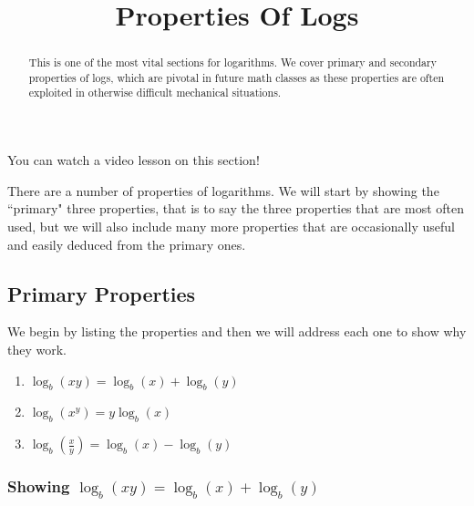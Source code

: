 \documentclass{ximera}
\title{Properties Of Logs}
\begin{document}
\begin{abstract}
    This is one of the most vital sections for logarithms. We cover primary and secondary properties of logs, which are pivotal in future math classes as these properties are often exploited in otherwise difficult mechanical situations.
\end{abstract}
\maketitle

You can watch a video lesson on this section!


There are a number of properties of logarithms. We will start by showing the ``primary" three properties, that is to say the three properties that are most often used, but we will also include many more properties that are occasionally useful and easily deduced from the primary ones.

\subsection*{Primary Properties}
    
    We begin by listing the properties and then we will address each one to show why they work.
    
    \begin{enumerate}
        \item $\log_b(xy) = \log_b(x) + \log_b(y)$
        \item $\log_b(x^y) = y\log_b(x)$
        \item $\log_b\left(\frac{x}{y}\right) = \log_b(x) - \log_b(y)$
    \end{enumerate}
    
    \subsubsection*{Showing $\log_b(xy) = \log_b(x) + \log_b(y)$}
        
\end{document}
